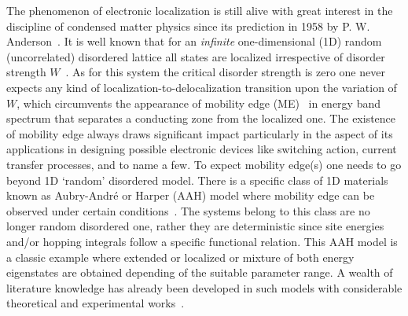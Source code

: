 \documentclass[prb,aps,twocolumn,amsmath,amssymb,floatfix,
superscriptaddress]{revtex4}
\begin{document}
The phenomenon of electronic localization is still alive with great interest
in the discipline of condensed matter physics since its prediction in 1958 
by P. W. Anderson~\cite{ander}. It is well known that for an {\em infinite} 
one-dimensional (1D) random (uncorrelated) disordered lattice all states are 
localized irrespective of disorder strength $W$~\cite{ander,lee}. As for this 
system the critical disorder strength is zero one never expects any kind of 
localization-to-delocalization transition upon the variation of $W$, which
circumvents the appearance of mobility edge (ME)~\cite{choi,san1,skm1} in energy 
band spectrum that 
separates a conducting zone from the localized one. The existence of mobility 
edge always draws significant impact particularly in the aspect of its 
applications in designing possible electronic devices like switching action,
current transfer processes, and to name a few. To expect mobility edge(s) 
one needs to go beyond 1D `random' disordered model. There is a specific
class of 1D materials known as Aubry-Andr\'{e} or Harper (AAH) model where
mobility edge can be observed under certain conditions~\cite{aub}. The systems 
belong to this class are no longer random disordered one, rather they are 
deterministic since site energies and/or hopping integrals follow a specific
functional relation. This AAH model is a classic example where extended or 
localized or mixture of both energy eigenstates are obtained depending of 
the suitable parameter range. A wealth of literature knowledge has already
been developed in such models with considerable theoretical and experimental 
works~\cite{mou,das1,das2,exp1,exp2,exp3,exp4}.
\end{document}
